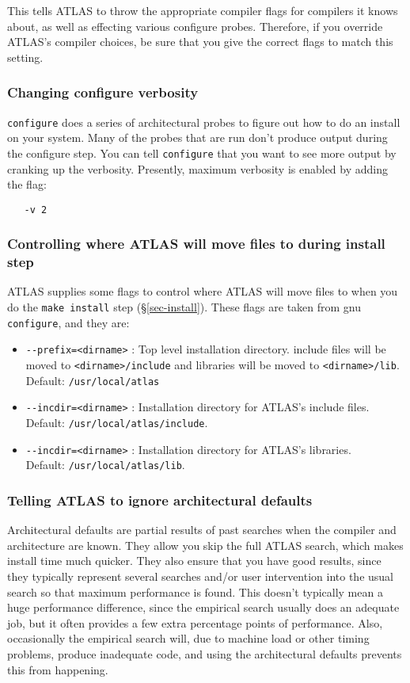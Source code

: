 \documentclass[11pt]{article}
\begin{document}
This tells ATLAS to throw the appropriate compiler flags for compilers it
knows about, as well as effecting various configure probes.  Therefore, if
you override ATLAS's compiler choices, be sure that you give the correct
flags to match this setting.

\subsubsection{Changing configure verbosity}
\label{sec-verb}
{\tt configure} does a series of architectural probes to figure out how to do
an install on your system.  Many of the probes that are run don't produce
output during the configure step.  You can tell {\tt configure} that you want
to see more output by cranking up the verbosity.  Presently, maximum 
verbosity is enabled by adding the flag:
\vspace*{-0.1in}
\begin{verbatim}
   -v 2
\end{verbatim}

\subsubsection{Controlling where ATLAS will move files to during install step}
ATLAS supplies some flags to control where ATLAS will move files to when
you do the {\tt make install} step (\S\ref{sec-install}).  These flags
are taken from gnu {\tt configure}, and they are:
\begin{itemize}
\item \verb|--prefix=<dirname>| : Top level installation directory.
      include files will be moved to \verb|<dirname>/include| and
      libraries will be moved to \verb|<dirname>/lib|.
      Default: {\tt /usr/local/atlas}
\item \verb|--incdir=<dirname>| : Installation directory for ATLAS's
      include files.  Default: {\tt /usr/local/atlas/include}.
\item \verb|--incdir=<dirname>| : Installation directory for ATLAS's
      libraries. \\ Default: {\tt /usr/local/atlas/lib}.
\end{itemize}

\subsubsection{Telling ATLAS to ignore architectural defaults}
\label{sec-nodefaults}
Architectural defaults are partial results of past searches when
the compiler and architecture are known.  They allow you skip the
full ATLAS search, which makes install time much quicker.  They also
ensure that you have good results, since they typically represent
several searches and/or user intervention into the usual search so
that maximum performance is found.  This doesn't typically mean a huge
performance difference, since the empirical search usually does an adequate
job, but it often provides a few extra percentage points of performance.  Also,
occasionally the empirical search will, due to machine load or other timing
problems, produce inadequate code, and using the architectural defaults
prevents this from happening.
\end{document}
